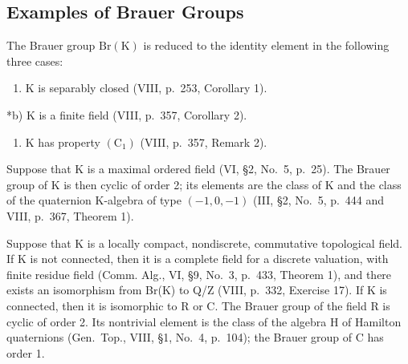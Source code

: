 \subsection{Examples of Brauer Groups}

The Brauer group \(\mathrm{Br}(\mathrm{K})\) is reduced to the identity element in the following three cases:

\begin{enumerate}
\def\labelenumi{\alph{enumi})}
\tightlist
\item
  K is separably closed (VIII, p.~253, Corollary 1).
\end{enumerate}

*b) K is a finite field (VIII, p.~357, Corollary 2).

\begin{enumerate}
\def\labelenumi{\alph{enumi})}
\setcounter{enumi}{2}
\tightlist
\item
  K has property \((\mathrm{C}_1)\) (VIII, p.~357, Remark 2).
\end{enumerate}

Suppose that K is a maximal ordered field (VI, §2, No.~5, p.~25). The Brauer group of K is then cyclic of order 2; its elements are the class of K and the class of the quaternion K-algebra of type \((-1,0,-1)\) (III, §2, No.~5, p.~444 and VIII, p.~367, Theorem 1).

Suppose that K is a locally compact, nondiscrete, commutative topological field. If K is not connected, then it is a complete field for a discrete valuation, with finite residue field (Comm. Alg., VI, §9, No.~3, p.~433, Theorem 1), and there exists an isomorphism from Br(K) to Q/Z (VIII, p.~332, Exercise 17). If K is connected, then it is isomorphic to R or C. The Brauer group of the field R is cyclic of order 2. Its nontrivial element is the class of the algebra H of Hamilton quaternions (Gen.~Top., VIII, §1, No.~4, p.~104); the Brauer group of C has order 1.

